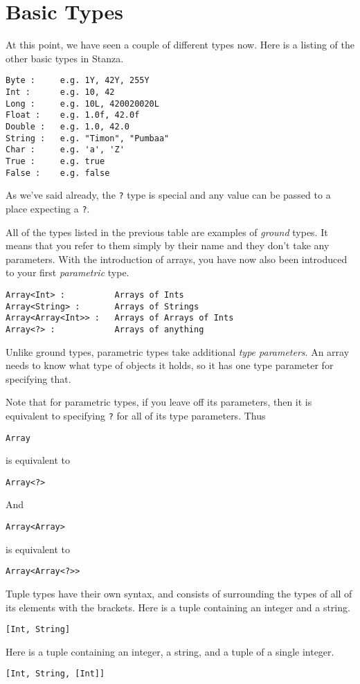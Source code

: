 \documentclass[10pt,oneside]{book}
\begin{document}
\section{Basic Types}
At this point, we have seen a couple of different types now. Here is a listing of the other basic types in Stanza.
\begin{lstlisting}
Byte :     e.g. 1Y, 42Y, 255Y
Int :      e.g. 10, 42
Long :     e.g. 10L, 420020020L
Float :    e.g. 1.0f, 42.0f
Double :   e.g. 1.0, 42.0
String :   e.g. "Timon", "Pumbaa"
Char :     e.g. 'a', 'Z'
True :     e.g. true
False :    e.g. false
\end{lstlisting}

As we've said already, the \texttt{\frenchspacing ?} type is special and any value can be passed to a place expecting a \texttt{\frenchspacing ?}.

All of the types listed in the previous table are examples of {\em ground} types. It means that you refer to them simply by their name and they don't take any parameters. With the introduction of arrays, you have now also been introduced to your first {\em parametric} type. 
\begin{lstlisting}
Array<Int> :          Arrays of Ints
Array<String> :       Arrays of Strings
Array<Array<Int>> :   Arrays of Arrays of Ints
Array<?> :            Arrays of anything
\end{lstlisting}

Unlike ground types, parametric types take additional {\em type parameters}. An array needs to know what type of objects it holds, so it has one type parameter for specifying that. 

Note that for parametric types, if you leave off its parameters, then it is equivalent to specifying \texttt{\frenchspacing ?} for all of its type parameters. Thus
\begin{lstlisting}
Array
\end{lstlisting}
is equivalent to
\begin{lstlisting}
Array<?>
\end{lstlisting}

And
\begin{lstlisting}
Array<Array>
\end{lstlisting}
is equivalent to
\begin{lstlisting}
Array<Array<?>>
\end{lstlisting}

Tuple types have their own syntax, and consists of surrounding the types of all of its elements with the \texttt{\frenchspacing []} brackets. Here is a tuple containing an integer and a string.
\begin{lstlisting}
[Int, String]
\end{lstlisting}
Here is a tuple containing an integer, a string, and a tuple of a single integer.
\begin{lstlisting}
[Int, String, [Int]]
\end{lstlisting}
\end{document}
